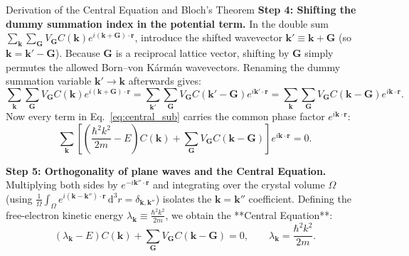 \documentclass[11pt,a4paper]{article}
\newcommand{\hb}{\hbar}
\newcommand{\hbarsq}{\hb^2}
\newcommand{\dd}{\mathrm{d}}
\newcommand{\kk}{\mathbf{k}}
\newcommand{\GG}{\mathbf{G}}
\newcommand{\rvec}{\mathbf{r}}
\begin{document}
\begin{methodbox}{Derivation of the Central Equation and Bloch's Theorem}
\textbf{Step 4: Shifting the dummy summation index in the potential term.}
In the double sum $\sum_{\kk}\sum_{\GG} V_{\GG} C(\kk) e^{i(\kk+\GG)\cdot\rvec}$, introduce the shifted wavevector $\kk' \equiv \kk + \GG$ (so $\kk = \kk' - \GG$). Because $\GG$ is a reciprocal lattice vector, shifting by $\GG$ simply permutes the allowed Born--von K\'arm\'an wavevectors. Renaming the dummy summation variable $\kk' \to \kk$ afterwards gives:
\begin{equation}
    \sum_{\kk}\sum_{\GG} V_{\GG} C(\kk) e^{i(\kk+\GG)\cdot\rvec} = \sum_{\kk'}\sum_{\GG} V_{\GG} C(\kk'-\GG) e^{i\kk'\cdot\rvec} = \sum_{\kk}\sum_{\GG} V_{\GG} C(\kk-\GG) e^{i\kk\cdot\rvec}.
\end{equation}
Now every term in Eq.~\eqref{eq:central_sub} carries the common phase factor $e^{i\kk\cdot\rvec}$:
\begin{equation}
    \sum_{\kk} \left[ \left(\frac{\hbarsq k^2}{2m} - E\right) C(\kk) + \sum_{\GG} V_{\GG} C(\kk-\GG) \right] e^{i\kk\cdot\rvec} = 0.
\end{equation}

\textbf{Step 5: Orthogonality of plane waves and the Central Equation.}
Multiplying both sides by $e^{-i\kk''\cdot\rvec}$ and integrating over the crystal volume $\Omega$ (using $\frac{1}{\Omega}\int_{\Omega} e^{i(\kk-\kk'')\cdot\rvec}\,\dd^3 r = \delta_{\kk,\kk''}$) isolates the $\kk = \kk''$ coefficient. Defining the free-electron kinetic energy $\lambda_{\kk} \equiv \frac{\hbarsq k^2}{2m}$, we obtain the **Central Equation**:
\begin{equation}
    \boxed{\left(\lambda_{\kk} - E\right)C(\kk) + \sum_{\GG} V_{\GG} C(\kk-\GG) = 0, \qquad \lambda_{\kk} = \frac{\hbarsq k^2}{2m}.}
    \label{eq:central_eq_master}
\end{equation}


\end{methodbox}
\end{document}
